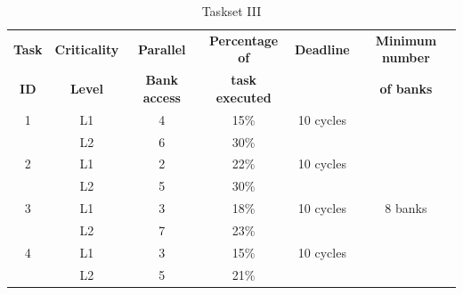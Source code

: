 \begin{table}[t]
\centering
  \begin{tabular}{|c|c|c|c|c|c|}\hline
  {\bf Task} & {\bf Criticality} & {\bf Parallel} & {\bf Percentage of} & {\bf Deadline} & {\bf Minimum number}\\  
   {\bf ID} & {\bf Level} & {\bf Bank access} & {\bf task executed} &             & {\bf of banks}\\ \hline
   1 & L1  & 4 & 15\% & 10 cycles & \\
     & L2 & 6 & 30\% &            & \\
   2 & L1 & 2 & 22\% & 10 cycles & \\
     & L2 & 5 & 30\% &           & \\
   3 & L1 & 3 & 18\% & 10 cycles & 8 banks \\
     & L2 & 7 & 23\% &           & \\
   4 & L1 & 3 & 15\% & 10 cycles & \\
     & L2 & 5 & 21\% &           & \\ \hline    
   \end{tabular}
   \caption{Taskset III}
   \end{table}

 
